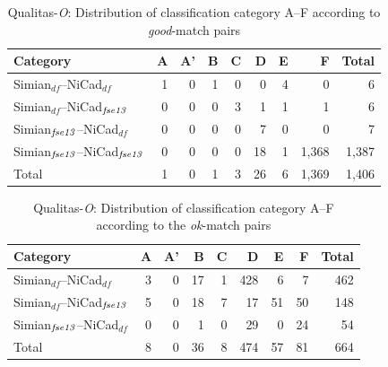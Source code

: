 \documentclass{IEEEtran}
\begin{document}
\begin{table}[H]
	\centering
	\caption{Qualitas-\textit{O}: Distribution of classification category A--F according to \textit{good}-match pairs}
	\label{tab:good_classification}
	\begin{tabular}{|l|r|r|r|r|r|r|r|r|}
		\hline 
		Category   & A   & 	A'   & 	B   & C   & D   &	E   &	F   & Total  \\
		\hline
		Simian$_{df}$--NiCad$_{df}$   & 1 & 0 & 1 & 0 & 0 & 4 & 0 & 6 \\
		Simian$_{df}$--NiCad$_{\textrm{\textit{fse13}}}$   & 0 & 0 & 0 & 3 & 1 & 1 & 1 & 6 \\
		Simian$_{\textrm{\textit{fse13}}}$--NiCad$_{df}$   & 0 & 0 & 0 & 0 & 7 & 0 & 0 & 7 \\
		Simian$_{\textrm{\textit{fse13}}}$--NiCad$_{\textrm{\textit{fse13}}}$   & 0 & 0 & 0 & 0 & 18 & 1 & 1,368 & 1,387 \\
		\hline
		Total   &   1   &   0   &   1   &   3   &   26   &   6   & 1,369  & 1,406 \\
		\hline
	\end{tabular} 
\end{table}

\begin{table}[H]
	\centering
	\caption{Qualitas-\textit{O}: Distribution of classification category A--F  according to the \textit{ok}-match pairs}
	\label{tab:ok_classification}
	\begin{tabular}{|l|r|r|r|r|r|r|r|r|}
		\hline 
		Category   																										& A   	& 	A' 	& 	B  & C	   & D   	&	E   &	F   & Total  \\
		\hline
		Simian$_{df}$--NiCad$_{df}$  & 3 	& 0 	& 17	& 1 	& 428  & 6 		& 7 	&  462 \\
		Simian$_{df}$--NiCad$_{\textrm{\textit{fse13}}}$   									& 5 	& 0 	& 18 	& 7 	& 17 	 & 51 	  & 50 		&  148 \\
		Simian$_{\textrm{\textit{fse13}}}$--NiCad$_{df}$   									& 0 	& 0 	& 1 	& 0 	 & 29 	  & 0 		& 24 	& 54 \\
		\hline
		Total   &   8  &   0   &  36   &  8   &   474   &   57   & 81  & 664 \\
		\hline
	\end{tabular} 
\end{table}
\end{document}
